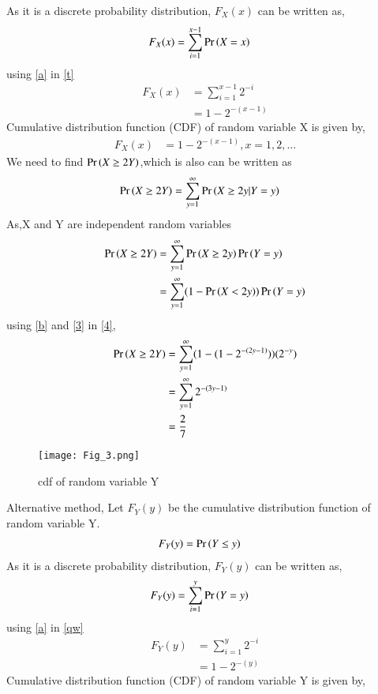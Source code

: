 \documentclass[journal,12pt,twocolumn]{IEEEtran}
\begin{document}
As it is a discrete probability distribution, $F_X(x)$ can be written as,
\begin{align}
    F_X(x)&= \sum_{i=1}^{x-1}\Pr\left(X=x\right) 
\end{align}\label{t}
using \eqref{a} in \eqref{t}
\begin{align}
    F_X(x)&=\sum_{i=1}^{x-1}2^{-i}\\
         &=1-2^{-(x-1)} 
\end{align}
Cumulative distribution function (CDF) of random variable X is given by,
\begin{align}
    F_X(x)&=1-2^{-(x-1)} ,x=1,2,\dots \label{3}
\end{align} 
We need to find $\Pr\left(X\ge 2Y\right)$,which is also can be written as
\begin{align}
    \Pr\left(X\ge 2Y\right) &=\sum_{y=1}^{\infty}\Pr\left(X \ge 2y|Y=y\right)
\end{align}
As,X and Y are independent random variables
\begin{align}
    \Pr\left(X\ge 2Y\right) &=\sum_{y=1}^{\infty}\Pr\left(X \ge 2y\right)\Pr\left(Y=y\right)\\
               &=\sum_{y=1}^{\infty}(1-\Pr\left(X < 2y\right))\Pr\left(Y=y\right) \label{4}
\end{align}
using \eqref{b} and \eqref{3} in \eqref{4},
\begin{align}
\Pr\left(X\ge 2Y\right) &=\sum_{y=1}^{\infty}(1-(1-2^{-(2y-1)}))(2^{-y})\\
           &=\sum_{y=1}^{\infty}2^{-(3y-1)}\\
               &=\frac{2}{7}
\end{align}
\begin{figure}[ht]
    \centering
    \texttt{[image: Fig\_3.png]}
    \caption{cdf of random variable Y}
    \label{Fig_3}
\end{figure}
Alternative method,
Let $F_Y(y)$ be the cumulative distribution function of random variable Y.
\begin{align}
    F_Y(y)&=\Pr\left(Y\le y\right)
\end{align}
As it is a discrete probability distribution, $F_Y(y)$ can be written as,
\begin{align}
    F_Y(y)&= \sum_{i=1}^{y}\Pr\left(Y=y\right)  \label{qw} 
\end{align}
using \eqref{a} in \eqref{qw}
\begin{align}
    F_Y(y)&=\sum_{i=1}^{y}2^{-i}\\
         &=1-2^{-(y)} 
\end{align}
Cumulative distribution function (CDF) of random variable Y is given by,
\end{document}
